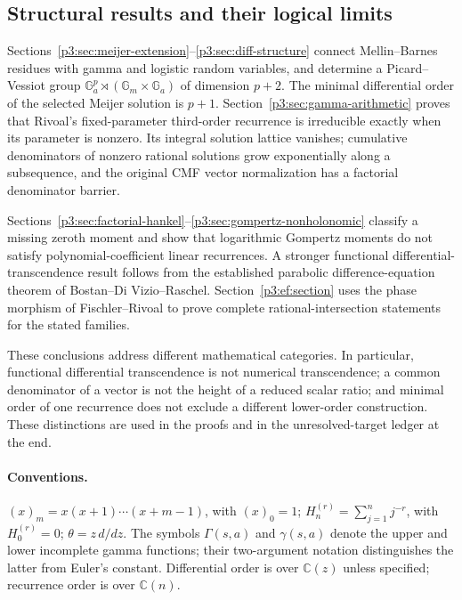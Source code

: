\documentclass[11pt,a4paper]{article}
\theoremstyle{definition}
\theoremstyle{remark}
\numberwithin{equation}{section}
\begin{document}
\subsection{Structural results and their logical limits}

Sections~\ref{p3:sec:meijer-extension}--\ref{p3:sec:diff-structure} connect
Mellin--Barnes residues with gamma and logistic random variables, and
determine a Picard--Vessiot group
$\mathbb G_a^p\rtimes(\mathbb G_m\times\mathbb G_a)$ of dimension $p+2$.
The minimal differential order of the selected Meijer solution is $p+1$.
Section~\ref{p3:sec:gamma-arithmetic} proves that Rivoal's fixed-parameter
third-order recurrence is irreducible exactly when its parameter is nonzero.
Its integral solution lattice vanishes; cumulative denominators of nonzero
rational solutions grow exponentially along a subsequence, and the original CMF vector normalization
has a factorial denominator barrier.

Sections~\ref{p3:sec:factorial-hankel}--\ref{p3:sec:gompertz-nonholonomic}
classify a missing zeroth moment and show that logarithmic Gompertz moments
do not satisfy polynomial-coefficient linear recurrences. A stronger
functional differential-transcendence result follows from the established
parabolic difference-equation theorem of Bostan--Di Vizio--Raschel.
Section~\ref{p3:ef:section} uses the phase morphism of Fischler--Rivoal to
prove complete rational-intersection statements for the stated families.

These conclusions address different mathematical categories. In
particular, functional differential transcendence is not numerical
transcendence; a common denominator of a vector is not the height of a
reduced scalar ratio; and minimal order of one recurrence does not exclude
a different lower-order construction. These distinctions are used in the
proofs and in the unresolved-target ledger at the end.

\paragraph{Conventions.}
$(x)_m=x(x+1)\cdots(x+m-1)$, with $(x)_0=1$;
$H_n^{(r)}=\sum_{j=1}^n j^{-r}$, with $H_0^{(r)}=0$;
$\theta=z\,d/dz$. The symbols $\Gamma(s,a)$ and $\gamma(s,a)$ denote
the upper and lower incomplete gamma functions; their two-argument notation
distinguishes the latter from Euler's constant. Differential order is over
$\mathbb C(z)$ unless specified; recurrence order is over $\mathbb C(n)$.
\end{document}
